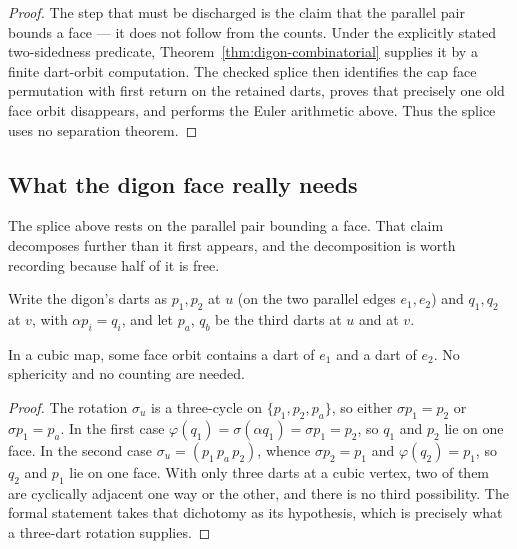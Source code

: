 \begin{proof}
The step that must be discharged is the claim that the parallel pair bounds
a face --- it does not follow from the counts.  Under the explicitly stated
two-sidedness predicate, Theorem~\ref{thm:digon-combinatorial} supplies it by
a finite dart-orbit computation.  The checked splice then identifies the cap
face permutation with first return on the retained darts, proves that precisely
one old face orbit disappears, and performs the Euler arithmetic above.  Thus
the splice uses no separation theorem.
\end{proof}

\subsection{What the digon face really needs}

The splice above rests on the parallel pair bounding a face. That claim
decomposes further than it first appears, and the decomposition is worth
recording because half of it is free.

Write the digon's darts as $p_1, p_2$ at $u$ (on the two parallel edges
$e_1, e_2$) and $q_1, q_2$ at $v$, with $\alpha p_i = q_i$, and let $p_a$,
$q_b$ be the third darts at $u$ and at $v$.

\begin{lemma}\label{lem:digon-shares}
In a cubic map, some face orbit contains a dart of $e_1$ and a dart of
$e_2$. No sphericity and no counting are needed.
\end{lemma}

\begin{proof}
The rotation $\sigma_u$ is a three-cycle on $\{p_1, p_2, p_a\}$, so either
$\sigma p_1 = p_2$ or $\sigma p_1 = p_a$. In the first case
$\varphi(q_1) = \sigma(\alpha q_1) = \sigma p_1 = p_2$, so $q_1$ and $p_2$
lie on one face. In the second case $\sigma_u = (p_1\,p_a\,p_2)$, whence
$\sigma p_2 = p_1$ and $\varphi(q_2) = p_1$, so $q_2$ and $p_1$ lie on one
face. With only three darts at a cubic vertex, two of them are cyclically
adjacent one way or the other, and there is no third possibility. The
formal statement takes that dichotomy as its hypothesis, which is precisely
what a three-dart rotation supplies.
\end{proof}

